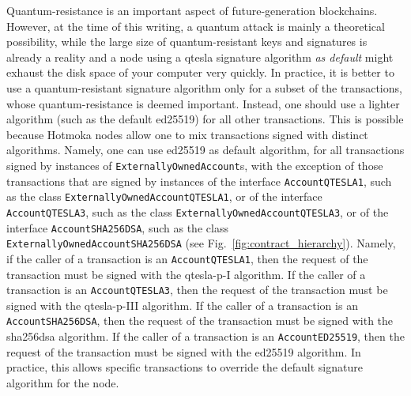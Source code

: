 Quantum-resistance is an important aspect of future-generation blockchains.
However, at the time of this writing, a quantum attack is mainly a theoretical
possibility, while the large size of quantum-resistant keys and signatures is
already a reality and a node using a qtesla signature algorithm \emph{as default}
might exhaust the disk space of your computer very quickly. In practice, it is better
to use a quantum-resistant signature algorithm only for a subset of the transactions, whose
quantum-resistance is deemed important. Instead, one should use a lighter algorithm
(such as the default ed25519) for all other transactions. This is possible because
Hotmoka nodes allow one to mix transactions signed with distinct algorithms.
Namely, one can use ed25519 as default algorithm, for all transactions signed
by instances of \texttt{ExternallyOwnedAccount}s,
with the exception of those transactions that are signed by instances of
the interface \texttt{AccountQTESLA1},
such as the class \texttt{ExternallyOwnedAccountQTESLA1},
or of the interface \texttt{AccountQTESLA3},
such as the class \texttt{ExternallyOwnedAccountQTESLA3},
or of the interface \texttt{AccountSHA256DSA},
such as the class \texttt{ExternallyOwnedAccountSHA256DSA}
(see Fig.~\ref{fig:contract_hierarchy}).
Namely, if the caller of a transaction is an \texttt{AccountQTESLA1}, then the
request of the transaction must be signed with the qtesla-p-I algorithm.
If the caller of a transaction is an \texttt{AccountQTESLA3}, then the
request of the transaction must be signed with the qtesla-p-III algorithm.
If the caller of a transaction is an \texttt{AccountSHA256DSA}, then the
request of the transaction must be signed with the sha256dsa algorithm.
If the caller of a transaction is an \texttt{AccountED25519}, then the
request of the transaction must be signed with the ed25519 algorithm.
In practice, this allows specific transactions to override the default signature
algorithm for the node.

